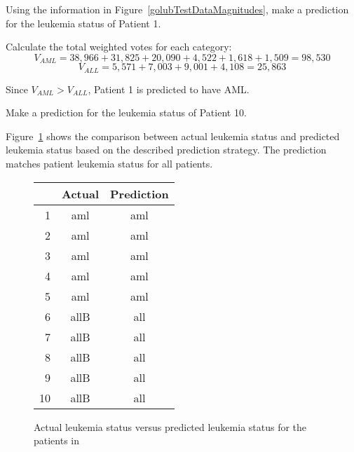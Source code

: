\begin{examplewrap}
\begin{nexample}{Using the information in Figure~\ref{golubTestDataMagnitudes}, make a prediction for the leukemia status of Patient 1.}
	
Calculate the total weighted votes for each category:
\[V_{AML} = 38,966 + 31,825 + 20,090 + 4,522 + 1,618 + 1,509 = 98,530 \]
\[V_{ALL} = 5,571 + 7,003 + 9,001 + 4,108 = 25,863 \]	

Since $V_{AML} > V_{ALL}$, Patient 1 is predicted to have AML.
\end{nexample}
\end{examplewrap}

\begin{exercisewrap}
\begin{nexercise}
Make a prediction for the leukemia status of Patient 10.\footnotemark{}
\end{nexercise}
\end{exercisewrap}

Figure~\ref{golubActualPrediction} shows the comparison between actual leukemia status and predicted leukemia status based on the described prediction strategy. The prediction matches patient leukemia status for all patients. 

\begin{figure}[ht]
	\centering
	\begin{tabular}{r|cc}
		\hline
		& Actual & Prediction \\ 
		\hline
		1 & aml & aml \\ 
		2 & aml & aml \\ 
		3 & aml & aml \\ 
		4 & aml & aml \\ 
		5 & aml & aml \\ 
		6 & allB & all \\ 
		7 & allB & all \\ 
		8 & allB & all \\ 
		9 & allB & all \\ 
		10 & allB & all \\ 
		\hline
	\end{tabular}
	\caption{Actual leukemia status versus predicted leukemia status for the patients in  \label{golubActualPrediction}}
\end{figure}


